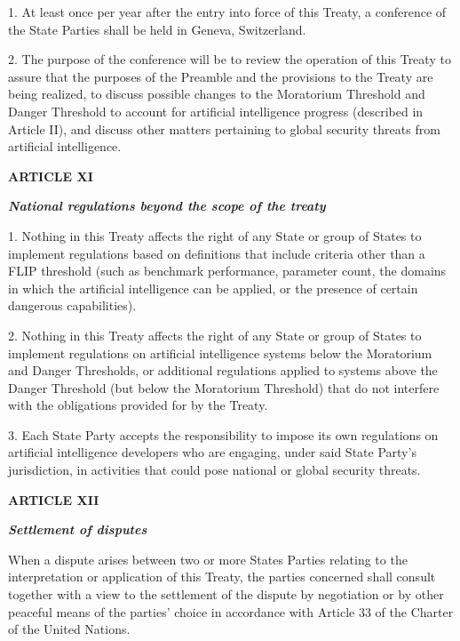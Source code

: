 \documentclass[12pt,a4paper]{article}
\begin{document}
1. At least once per year after the entry into force of this Treaty, a conference of the State Parties shall be held in Geneva, Switzerland. 

2. The purpose of the conference will be to review the operation of this Treaty to assure that the purposes of the Preamble and the provisions to the Treaty are being realized, to discuss possible changes to the Moratorium Threshold and Danger Threshold to account for artificial intelligence progress (described in Article II), and discuss other matters pertaining to global security threats from artificial intelligence. 

\begin{center}
    
\textbf{{ARTICLE XI}}

\textbf{\textit{National regulations beyond the scope of the treaty}}
\end{center}

1. Nothing in this Treaty affects the right of any State or group of States to implement regulations based on definitions that include criteria other than a FLIP threshold (such as benchmark performance, parameter count, the domains in which the artificial intelligence can be applied, or the presence of certain dangerous capabilities). 

2. Nothing in this Treaty affects the right of any State or group of States to implement regulations on artificial intelligence systems below the Moratorium and Danger Thresholds, or additional regulations applied to systems above the Danger Threshold (but below the Moratorium Threshold) that do not interfere with the obligations provided for by the Treaty.

3. Each State Party accepts the responsibility to impose its own regulations on artificial intelligence developers who are engaging, under said State Party’s jurisdiction, in activities that could pose national or global security threats.

\begin{center}
    
\textbf{{ARTICLE XII}}

\textbf{\textit{Settlement of disputes}}
\end{center}

When a dispute arises between two or more States Parties relating to the interpretation or application of this Treaty, the parties concerned shall consult together with a view to the settlement of the dispute by negotiation or by other peaceful means of the parties’ choice in accordance with Article 33 of the Charter of the United Nations. 
\end{document}
